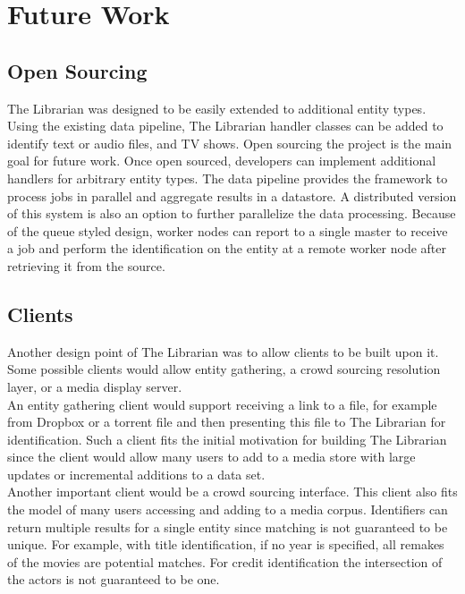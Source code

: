 \documentclass[paper=a4, fontsize=11pt]{scrartcl} %
\numberwithin{equation}{section} %
\numberwithin{figure}{section} %
\numberwithin{table}{section} %
\begin{document}


\section{Future Work}
\label{sec:future-work}

\subsection{Open Sourcing}
\label{sec:open-sourcing}
The Librarian was designed to be easily extended to additional entity types. Using the existing data pipeline, The Librarian handler classes can be added to identify text or audio files, and TV shows. Open sourcing the project is the main goal for future work. Once open sourced, developers can implement additional handlers for arbitrary entity types. The data pipeline provides the framework to process jobs in parallel and aggregate results in a datastore. A distributed version of this system is also an option to further parallelize the data processing. Because of the queue styled design, worker nodes can report to a single master to receive a job and perform the identification on the entity at a remote worker node after retrieving it from the source. \\

\subsection{Clients}
\label{sec:clients}
Another design point of The Librarian was to allow clients to be built upon it. Some possible clients would allow entity gathering, a crowd sourcing resolution layer, or a media display server. \\

An entity gathering client would support receiving a link to a file, for example from Dropbox or a torrent file and then presenting this file to The Librarian for identification. Such a client fits the initial motivation for building The Librarian since the client would allow many users to add to a media store with large updates or incremental additions to a data set. \\

Another important client would be a crowd sourcing interface. This client also fits the model of many users accessing and adding to a media corpus. Identifiers can return multiple results for a single entity since matching is not guaranteed to be unique. For example, with title identification, if no year is specified, all remakes of the movies are potential matches. For credit identification the intersection of the actors is not guaranteed to be one. \\
\end{document}
